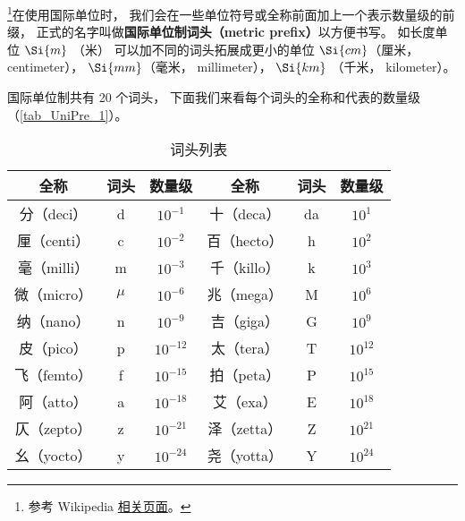 

\footnote{参考 Wikipedia \href{https://en.wikipedia.org/wiki/Metric_prefix}{相关页面}。}在使用国际单位时， 我们会在一些单位符号或全称前面加上一个表示数量级的前缀， 正式的名字叫做\textbf{国际单位制词头（metric prefix）}以方便书写。 如长度单位 $\Si{m}$ （米） 可以加不同的词头拓展成更小的单位 $\Si{cm}$（厘米， centimeter）， $\Si{mm}$（毫米， millimeter）， $\Si{km}$ （千米， kilometer）。

国际单位制共有 20 个词头， 下面我们来看每个词头的全称和代表的数量级（\autoref{tab_UniPre_1}）。

\begin{table}[ht]
\centering
\caption{词头列表}\label{tab_UniPre_1}
\begin{tabular}{|c|c|c|c|c|c|}
\hline
全称 & 词头 & 数量级 & 全称 & 词头 & 数量级 \\
\hline
分（deci） & d & $10^{-1}$ & 十（deca） & da & $10^1$ \\
\hline
厘（centi） & c & $10^{-2}$ & 百（hecto） & h & $10^2$ \\
\hline
毫（milli） & m & $10^{-3}$ & 千（killo） & k & $10^3$ \\
\hline
微（micro） & $\mu$ & $10^{-6}$ & 兆（mega） & M & $10^6$ \\
\hline
纳（nano） & n & $10^{-9}$ & 吉（giga） & G & $10^9$ \\
\hline
皮（pico） & p & $10^{-12}$ & 太（tera） & T & $10^{12}$ \\
\hline
飞（femto） & f & $10^{-15}$ & 拍（peta） & P & $10^{15}$ \\
\hline
阿（atto） & a & $10^{-18}$ & 艾（exa） & E & $10^{18}$ \\
\hline
仄（zepto） & z & $10^{-21}$ & 泽（zetta） & Z & $10^{21}$ \\
\hline
幺（yocto） & y & $10^{-24}$ & 尧（yotta） & Y & $10^{24}$ \\
\hline
\end{tabular}
\end{table}
